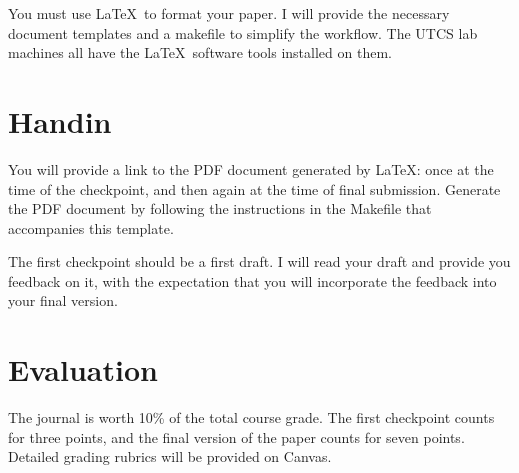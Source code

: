 \documentclass[11pt]{article}
\begin{document}
You must use \LaTeX\ to format your paper.
I will provide the necessary document templates and a makefile to simplify the workflow.
The UTCS lab machines all have the \LaTeX\ software tools installed on them.

\section{Handin}
You will provide a link to the PDF document generated by \LaTeX: 
once at the time of the checkpoint,
and then again at the time of final submission.
Generate the PDF document by following the instructions in the Makefile that accompanies this template.

The first checkpoint should be a first draft.
I will read your draft and provide you feedback on it,
with the expectation that you will incorporate the feedback into your final version.

\section{Evaluation}
The journal is worth 10\% of the total course grade.
The first checkpoint counts for three points,
and the final version of the paper counts for seven points.
Detailed grading rubrics will be provided on Canvas.


\end{document}
